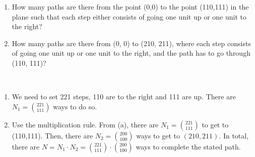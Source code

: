 
\setcounter{theorem}{6}
\begin{exercise}[BH.1.8]
	\begin{enumerate}
		\item How many paths are there from the point (0,0) to the point (110,111) in the plane such that each step either consists of going one unit up or one unit to the right?
		\item How many paths are there from (0, 0) to (210, 211), where each step consists of going one unit up or one unit to the right, and the path has to go through (110, 111)?
	\end{enumerate}
\begin{solution}~
	\begin{enumerate}
		\item We need to set 221 steps, 110 are to the right and 111 are up. There are $N_{1}={221 \choose 111}$ ways to do so.
		\item Use the multiplication rule. From (a), there are $N_{1}={221 \choose 111}$ to get to (110,111). Then, there are $N_{2}={200 \choose 100}$ ways to get to $(210,211)$. In total, there are $N= N_{1}\cdot N_{2} = {221 \choose 111}\cdot {200 \choose 100}$ ways to complete the stated path.
	\end{enumerate}
\end{solution}
\end{exercise}


